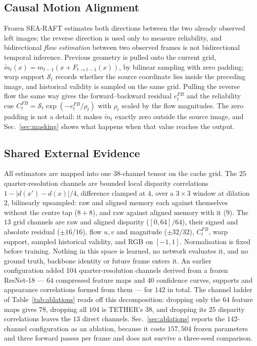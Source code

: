 \documentclass[letterpaper,10pt,conference]{ieeeconf}
\newcommand{\steer}{TETHER}
\begin{document}
\subsection{Causal Motion Alignment}

Frozen SEA-RAFT \cite{teed2020raft,wang2024searaft} estimates both directions
between the two already observed left images; the reverse direction is used
only to measure reliability, and bidirectional \emph{flow estimation} between
two observed frames is not bidirectional temporal inference. Previous geometry
is pulled onto the current grid,
$\widetilde m_t(x)=m_{t-1}(x+F_{t\rightarrow t-1}(x))$, by bilinear sampling
with zero padding; warp support $\mathcal{S}_t$ records whether the source
coordinate lies inside the preceding image, and historical validity is sampled
on the same grid. Pulling the reverse flow the same way gives the
forward--backward residual $e_t^{FB}$ and the reliability cue
$C_t^{FB}=\mathcal{S}_t\exp(-e_t^{FB}/\rho_t)$ with $\rho_t$ scaled by the
flow magnitudes. The zero padding is not a detail: it makes $\widetilde m_t$
exactly zero outside the source image, and Sec.~\ref{sec:masking} shows what
happens when that value reaches the output.

\subsection{Shared External Evidence}

All estimators are mapped into one 38-channel tensor on the cache grid. The
$25$ quarter-resolution channels are bounded local disparity correlations
$1-|d(x')-d(x)|/4$, difference clamped at $4$, over a $3\times3$ window at
dilation $2$, bilinearly upsampled: raw and aligned memory each against
themselves without the centre tap ($8{+}8$), and raw against aligned memory
with it ($9$). The $13$ grid channels are raw and aligned disparity
($[0,64]/64$), their signed and absolute residual ($\pm16/16$), flow $u,v$ and
magnitude ($\pm32/32$), $C_t^{FB}$, warp support, sampled historical validity,
and RGB on $[-1,1]$. Normalisation is fixed before training. Nothing in this space is learned, no network evaluates it,
and no ground truth, backbone identity or future frame enters it. An earlier
configuration added 104 quarter-resolution channels derived from a frozen
ResNet-18 \cite{he2016resnet} --- $64$ compressed feature maps and $40$
confidence curves, supports and appearance correlations formed from them ---
for $142$ in total. The channel ladder of Table~\ref{tab:ablations} reads off
this decomposition: dropping only the $64$ feature maps gives $78$, dropping
all $104$ is \steer's $38$, and dropping its $25$ disparity correlations
leaves the $13$ direct channels.
Sec.~\ref{sec:ablations} reports the $142$-channel configuration as an
ablation, because it costs $157{,}504$ frozen parameters and three forward
passes per frame and does not survive a three-seed comparison.
\end{document}

